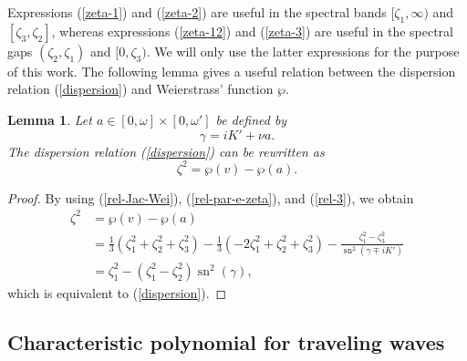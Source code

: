 \documentclass[12pt,reqno]{amsart}
\numberwithin{equation}{section}
\DeclareMathOperator{\sn}{sn}
\newtheorem{lemma}{Lemma}
\begin{document}
Expressions (\ref{zeta-1}) and (\ref{zeta-2}) are useful in the spectral bands $[\zeta_1,\infty)$ and $[\zeta_3,\zeta_2]$, whereas expressions (\ref{zeta-12}) and (\ref{zeta-3}) are useful in the spectral gaps $(\zeta_2,\zeta_1)$ and $[0,\zeta_3)$. We will only use the latter expressions for the purpose of this work. The following lemma gives a useful relation between the dispersion relation (\ref{dispersion}) and Weierstrass' function $\wp$. 

\begin{lemma}
	\label{lem-Weierstrass}
	Let $a \in [0,\omega] \times [0,\omega']$ be defined by 
	\begin{equation}
	\label{relation-gamma-a}
	\gamma = i K' + \nu a.
	\end{equation}
	The dispersion relation (\ref{dispersion}) can be rewritten as 
\begin{equation}
\label{Lame-disp-W}
\zeta^2 = \wp(v) - \wp(a).
\end{equation}
\end{lemma}

\begin{proof}
By using (\ref{rel-Jac-Wei}), (\ref{rel-par-e-zeta}), and (\ref{rel-3}), we obtain 
\begin{align*}
\zeta^2 &= \wp(v) - \wp(a) \\
&= \frac{1}{3} (\zeta_1^2 + \zeta_2^2 + \zeta_3^2) - \frac{1}{3} (-2\zeta_1^2 + \zeta_2^2 + \zeta_3^2) - \frac{\zeta_1^2 - \zeta_3^2}{\sn^2(\gamma \mp i K')} \\
&= \zeta_1^2 - (\zeta_1^2 - \zeta_2^2) \sn^2(\gamma),
\end{align*}
which is equivalent to (\ref{dispersion}).
\end{proof}


\subsection{Characteristic polynomial for traveling waves}
\label{sec-3-2}
\end{document}
